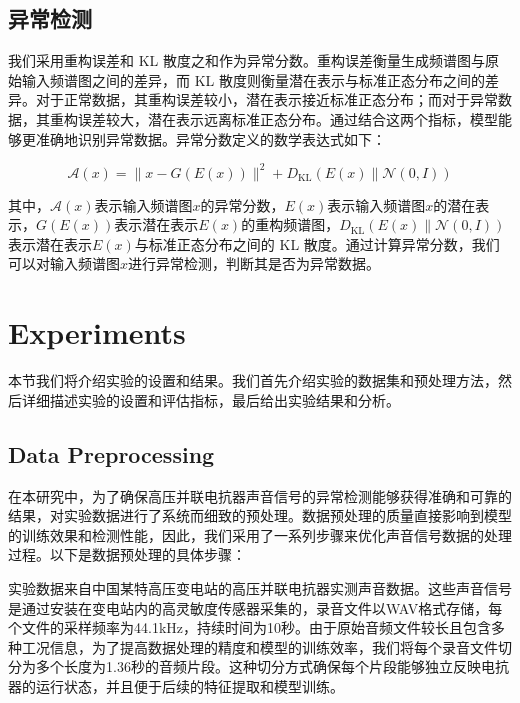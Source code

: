 \documentclass{article}
\begin{document}
\subsection{异常检测}

我们采用重构误差和 KL 散度之和作为异常分数。重构误差衡量生成频谱图与原始输入频谱图之间的差异，而 KL 散度则衡量潜在表示与标准正态分布之间的差异。对于正常数据，其重构误差较小，潜在表示接近标准正态分布；而对于异常数据，其重构误差较大，潜在表示远离标准正态分布。通过结合这两个指标，模型能够更准确地识别异常数据。异常分数定义的数学表达式如下：

\begin{equation}
\mathcal{A}(x)=\|x-G(E(x))\|^2+D_{\mathrm{KL}}(E(x) \| \mathcal{N}(0, I))
\end{equation}

其中，$\mathcal{A}(x)$表示输入频谱图$x$的异常分数，$E(x)$表示输入频谱图$x$的潜在表示，$G(E(x))$表示潜在表示$E(x)$的重构频谱图，$D_{\mathrm{KL}}(E(x) \| \mathcal{N}(0, I))$表示潜在表示$E(x)$与标准正态分布之间的 KL 散度。通过计算异常分数，我们可以对输入频谱图$x$进行异常检测，判断其是否为异常数据。

\section{Experiments}
本节我们将介绍实验的设置和结果。我们首先介绍实验的数据集和预处理方法，然后详细描述实验的设置和评估指标，最后给出实验结果和分析。

\subsection{Data Preprocessing}

在本研究中，为了确保高压并联电抗器声音信号的异常检测能够获得准确和可靠的结果，对实验数据进行了系统而细致的预处理。数据预处理的质量直接影响到模型的训练效果和检测性能，因此，我们采用了一系列步骤来优化声音信号数据的处理过程。以下是数据预处理的具体步骤：

实验数据来自中国某特高压变电站的高压并联电抗器实测声音数据。这些声音信号是通过安装在变电站内的高灵敏度传感器采集的，录音文件以WAV格式存储，每个文件的采样频率为44.1kHz，持续时间为10秒。由于原始音频文件较长且包含多种工况信息，为了提高数据处理的精度和模型的训练效率，我们将每个录音文件切分为多个长度为1.36秒的音频片段。这种切分方式确保每个片段能够独立反映电抗器的运行状态，并且便于后续的特征提取和模型训练。
\end{document}
